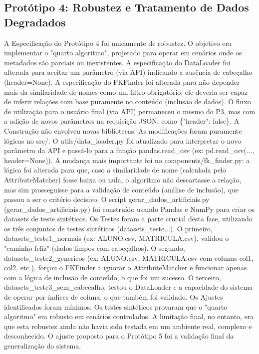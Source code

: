 \documentclass[12pt, a4paper]{article}
\begin{document}
\subsection{Protótipo 4: Robustez e Tratamento de Dados Degradados} 
\label{subsec:prototipo4}

A Especificação do Protótipo 4 foi unicamente de robustez. O objetivo era implementar o "quarto algoritmo", projetado para operar em cenários onde os metadados são parciais ou inexistentes. 
A especificação do DataLoader foi alterada para aceitar um parâmetro (via API) indicando a ausência de cabeçalho (header=None). 
A especificação do FKFinder foi alterada para não depender mais da similaridade de nomes como um filtro obrigatório; 
ele deveria ser capaz de inferir relações com base puramente no conteúdo (inclusão de dados). 
O fluxo de utilização para o usuário final (via API) permaneceu o mesmo do P3, mas com a adição de novos parâmetros na requisição JSON, como \{"header": false\}.
A Construção não envolveu novas bibliotecas. As modificações foram puramente lógicas no src/. 
O utils/data\_loader.py foi atualizado para interpretar o novo parâmetro da API e passá-lo para a função pandas.read\_csv (ex: pd.read\_csv(..., header=None)). 
A mudança mais importante foi no components/fk\_finder.py: a lógica foi alterada para que, caso a similaridade de nome (calculada pelo AttributeMatcher) fosse baixa ou nula, o algoritmo não descartasse a relação, mas sim prosseguisse para a validação de conteúdo (análise de inclusão), que passou a ser o critério decisivo. 
O script gerar\_dados\_artificiais.py (gerar\_dados\_artificiais.py) foi construído usando Pandas e NumPy para criar os datasets de teste sintéticos. 
Os Testes foram a parte crucial desta fase, utilizando os três conjuntos de testes sintéticos (datasets\_teste...). 
O primeiro, datasets\_teste1\_normais (ex: ALUNO.csv, MATRICULA.csv), validou o "caminho feliz" (dados limpos com cabeçalhos). 
O segundo, datasets\_teste2\_genericos (ex: ALUNO.csv, MATRICULA.csv com colunas col1, col2, etc.), forçou o FKFinder a ignorar o AttributeMatcher e funcionar apenas com a lógica de inclusão de conteúdo, o que foi um sucesso. 
O terceiro, datasets\_teste3\_sem\_cabecalho, testou o DataLoader e a capacidade do sistema de operar por índices de coluna, o que também foi validado. 
Os Ajustes identificados foram mínimos. Os testes sintéticos provaram que o "quarto algoritmo" era robusto em cenários controlados. 
A limitação final, no entanto, era que esta robustez ainda não havia sido testada em um ambiente real, complexo e desconhecido. 
O ajuste proposto para o Protótipo 5 foi a validação final da generalização do sistema. 
\end{document}
